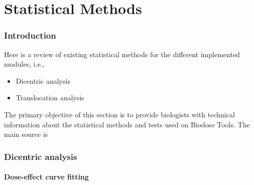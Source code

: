 \documentclass[]{scrartcl}
\providecommand{\tightlist}{%
  \setlength{\itemsep}{0pt}\setlength{\parskip}{0pt}}
\begin{document}
\hypertarget{part-statistical-methods}{%
\part{Statistical Methods}\label{part-statistical-methods}}

\hypertarget{stats-intro}{%
\section{Introduction}\label{stats-intro}}

Here is a review of existing statistical methods for the different implemented modules, i.e.,

\begin{itemize}
\tightlist
\item
  Dicentric analysis
\item
  Translocation analysis
\end{itemize}

The primary objective of this section is to provide biologists with technical information about the statistical methods and tests used on Biodose Tools. The main source is \citep{IAEA2001}

\hypertarget{stats-dicent}{%
\section{Dicentric analysis}\label{stats-dicent}}

\hypertarget{dose-effect-curve-fitting}{%
\subsection{Dose-effect curve fitting}\label{dose-effect-curve-fitting}}
\end{document}
